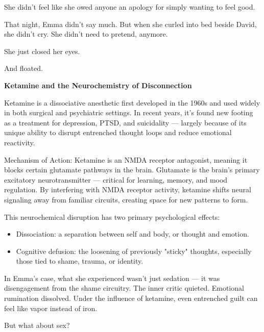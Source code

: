 She didn’t feel like she owed anyone an apology for simply wanting to feel good.

That night, Emma didn’t say much. But when she curled into bed beside David, she didn’t cry.
She didn’t need to pretend, anymore.

She just closed her eyes.

And floated.

\begin{TechnicalSidebar}{\textbf{Ketamine and the Neurochemistry of Disconnection}}

  Ketamine is a dissociative anesthetic first developed in the 1960s and used widely in both surgical and 
  psychiatric settings. In recent years, it's found new footing as a treatment for depression, PTSD, and 
  suicidality — largely because of its unique ability to disrupt entrenched thought loops and reduce 
  emotional reactivity.
  
  \medskip
  
  Mechanism of Action:
  Ketamine is an NMDA receptor antagonist, meaning it blocks certain glutamate pathways in the brain. 
  Glutamate is the brain’s primary excitatory neurotransmitter — critical for learning, memory, and mood 
  regulation. By interfering with NMDA receptor activity, ketamine shifts neural signaling away from familiar 
  circuits, creating space for new patterns to form.

  \medskip
  
  This neurochemical disruption has two primary psychological effects:
  
  \begin{itemize}
    \item Dissociation: a separation between self and body, or thought and emotion.
    \item Cognitive defusion: the loosening of previously "sticky" thoughts, especially those tied to shame, 
    trauma, or identity.
  \end{itemize}
  
  \medskip
  
  In Emma’s case, what she experienced wasn’t just sedation — it was disengagement from the shame circuitry. The 
  inner critic quieted. Emotional rumination dissolved. Under the influence of ketamine, even entrenched guilt 
  can feel like vapor instead of iron.
  
  \medskip
  
  But what about sex?

  \medskip
  

\end{TechnicalSidebar}
